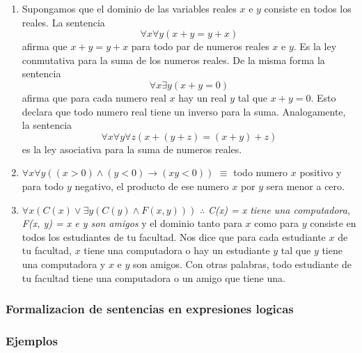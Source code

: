 \documentclass[]{article}
\begin{document}
\begin{enumerate}
	\item Supongamos que el dominio de las variables reales $x$ e $y$ consiste en todos los reales. La sentencia 
	\begin{equation*}
		\forall{x} \forall{y} (x + y = y + x)
	\end{equation*} 
	afirma que $x + y = y + x$ para todo par de numeros reales $x$ e $y$. Es la ley conmutativa para la suma de los numeros reales. De la misma forma la sentencia 
	\begin{equation*}
		\forall{x} \exists{y} (x + y = 0)
	\end{equation*} 
	afirma que para cada numero real $x$ hay un real $y$ tal que $x + y = 0$. Esto declara que todo numero real tiene un inverso para la suma. Analogamente, la sentencia 
	\begin{equation*}
		\forall{x}\forall{y}\forall{z} (x + (y + z) = (x + y) + z)
	\end{equation*} 
	es la ley asociativa para la suma de numeros reales.
	
	\item $\forall{x} \forall{y} ((x > 0) \wedge (y < 0) \rightarrow (xy < 0))$ $\equiv$ todo numero $x$ positivo y para todo $y$ negativo, el producto de ese numero $x$ por $y$ sera menor a cero.
	
	\item $\forall{x} (C(x) \vee \exists{y} (C(y) \wedge F(x, y)))$ $\therefore$ \textit{C(x) = x tiene una computadora}, \textit{F(x, y) = x e y son amigos} y el dominio tanto para $x$ como para $y$ consiste en todos los estudiantes de tu facultad.
	Nos dice que para cada estudiante $x$ de tu facultad, $x$ tiene una computadora o hay un estudiante $y$ tal que $y$ tiene una computadora y $x$ e $y$ son amigos. Con otras palabras, todo estudiante de tu facultad tiene una computadora o un amigo que tiene una.
\end{enumerate}

\subsubsection*{Formalizacion de sentencias en expresiones logicas}

\subsubsection*{Ejemplos}
\end{document}
